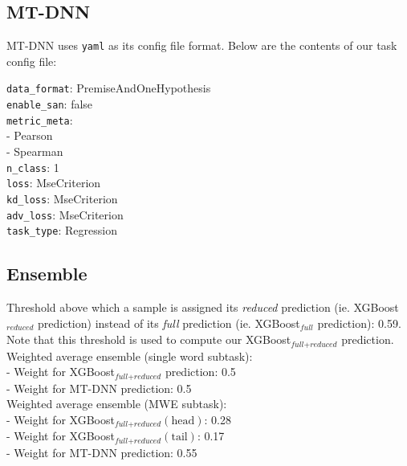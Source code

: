 \documentclass[11pt,a4paper]{article}
\begin{document}
\subsection{MT-DNN}

MT-DNN uses \texttt{yaml} as its config file format. Below are the contents of our task config file:

\indent \texttt{data\_format}: PremiseAndOneHypothesis\\
\indent \texttt{enable\_san}: false\\
\indent \texttt{metric\_meta}:\\
\indent - Pearson\\
\indent - Spearman\\
\indent \texttt{n\_class}: 1\\
\indent \texttt{loss}: MseCriterion\\
\indent \texttt{kd\_loss}: MseCriterion\\
\indent \texttt{adv\_loss}: MseCriterion\\
\indent \texttt{task\_type}: Regression

\subsection{Ensemble}

Threshold above which a sample is assigned its \textit{reduced} prediction (ie. XGBoost$_\textit{reduced}$ prediction) instead of its \textit{full} prediction (ie. XGBoost$_\textit{full}$ prediction): 0.59. Note that this threshold is used to compute our XGBoost$
_{\textit{full}+\textit{reduced}}$ prediction.\\

\noindent Weighted average ensemble (single word subtask):\\
- Weight for XGBoost$_{\textit{full}+\textit{reduced}}$ prediction: 0.5\\
- Weight for MT-DNN prediction: 0.5\\

\noindent Weighted average ensemble (MWE subtask):\\
- Weight for XGBoost$_{\textit{full}+\textit{reduced}}(\text{head})$: 0.28 \\
- Weight for XGBoost$_{\textit{full}+\textit{reduced}}(\text{tail})$: 0.17 \\
- Weight for MT-DNN prediction: 0.55\\
\end{document}
